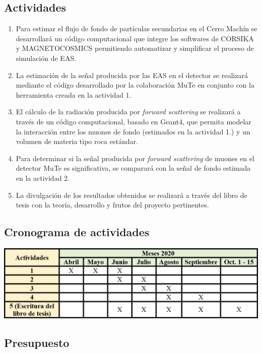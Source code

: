 \documentclass[12pt]{report}
\begin{document}
\subsection*{Actividades}
\begin{enumerate}
    \item Para estimar el flujo de fondo de partículas secundarias en el Cerro Machín se desarrollará un código computacional que integre los softwares de CORSIKA y MAGNETOCOSMICS permitiendo automatizar y simplificar el proceso de simulación de EAS.
    \item La estimación de la señal producida por las EAS en el detector se realizará mediante el código desarrollado por la colaboración MuTe en conjunto con la herramienta creada en la actividad 1.
    
    \item El cálculo de la radiación producida por \textit{forward scattering} se realizará a través de
    un código computacional, basado en Geant4, que permita modelar la interacción entre los muones de fondo (estimados en la actividad 1.) y un volumen de materia tipo roca estándar.
    
    \item Para determinar si la señal producida por \textit{forward scattering} de muones en el detector MuTe es significativa, se comparará con la señal de fondo estimada en la actividad 2.
    \item La divulgación de los resultados obtenidos se realizará a través del libro de tesis con la teoría, desarrollo y frutos del proyecto pertinentes.
\end{enumerate}

\subsection*{Cronograma de actividades}
\begin{center}
    \includegraphics[width=\textwidth]{images/cronograma.png}
\end{center}


\subsection*{Presupuesto}
\end{document}
